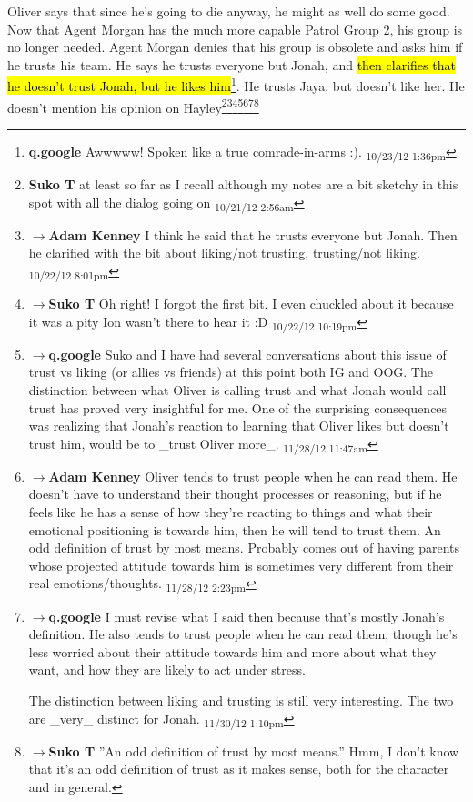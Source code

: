 Oliver says that since he's going to die anyway, he might as well do some good.  Now that Agent Morgan has the much more capable Patrol Group 2, his group is no longer needed.  Agent Morgan denies that his group is obsolete and asks him if he trusts his team.  He says he trusts everyone but Jonah, and \hl{then clarifies that he doesn't trust Jonah, but he likes him}\footnote{\textbf{q.google }Awwwww!  Spoken like a true comrade-in-arms :). \textsubscript{10/23/12 1:36pm}}.  He trusts Jaya, but doesn't like her.  He doesn't mention his opinion on Hayley\footnote{\textbf{Suko T }at least so far as I recall although my notes are a bit sketchy in this spot with all the dialog going on \textsubscript{10/21/12 2:56am}}\footnote{$\rightarrow$\textbf{Adam Kenney }I think he said that he trusts everyone but Jonah.  Then he clarified with the bit about liking/not trusting, trusting/not liking. \textsubscript{10/22/12 8:01pm}}\footnote{$\rightarrow$\textbf{Suko T }Oh right!  I forgot the first bit.  I even chuckled about it because it was a pity Ion wasn't there to hear it :D \textsubscript{10/22/12 10:19pm}}\footnote{$\rightarrow$\textbf{q.google }Suko and I have had several conversations about this issue of trust vs liking (or allies vs friends) at this point both IG and OOG.  The distinction between what Oliver is calling trust and what Jonah would call trust has proved very insightful for me.  One of the surprising consequences was realizing that Jonah's reaction to learning that Oliver likes but doesn't trust him, would be to \_trust Oliver more\_. \textsubscript{11/28/12 11:47am}}\footnote{$\rightarrow$\textbf{Adam Kenney }Oliver tends to trust people when he can read them.  He doesn't have to understand their thought processes or reasoning, but if he feels like he has a sense of how they're reacting to things and what their emotional positioning is towards him, then he will tend to trust them.  An odd definition of trust by most means.  Probably comes out of having parents whose projected attitude towards him is sometimes very different from their real emotions/thoughts. \textsubscript{11/28/12 2:23pm}}\footnote{$\rightarrow$\textbf{q.google }I must revise what I said then because that's mostly Jonah's definition.  He also tends to trust people when he can read them, though he's less worried about their attitude towards him and more about what they want, and how they are likely to act under stress.

The distinction between liking and trusting is still very interesting.  The two are \_very\_ distinct for Jonah. \textsubscript{11/30/12 1:10pm}}\footnote{$\rightarrow$\textbf{Suko T }''An odd definition of trust by most means.''
Hmm, I don't know that it's an odd definition of trust as it makes sense, both for the character and in general.

}
